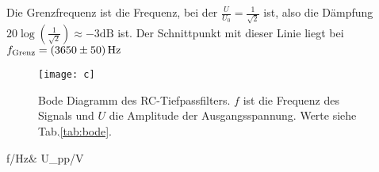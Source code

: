 \documentclass{article}
\newcommand{\mr}{\mathrm}
\begin{document}
Die Grenzfrequenz ist die Frequenz, bei der $\frac{U}{U_0}=\frac{1}{\sqrt{2}}$ ist, also die Dämpfung $20\log(\frac{1}{\sqrt{2}}) \approx -3 \unit{\dB}$ ist. Der Schnittpunkt mit dieser Linie liegt bei $f_\mr{Grenz} = \SI{3650 \pm 50}{\Hz}$

\begin{figure}
    \centering
    \texttt{[image: c]}
    \caption{Bode Diagramm des RC-Tiefpassfilters. $f$ ist die Frequenz des Signals und $U$ die Amplitude der Ausgangsspannung. Werte siehe Tab.\ref{tab:bode}.}
    \label{fig:bode}
\end{figure}

\begin{table}[]
    \centering
    {\csname f/Hz\endcsname & \csname U_pp/V\endcsname}
    \caption{}
    \label{tab:bode}
\end{table}



\endgroup

\end{document}
